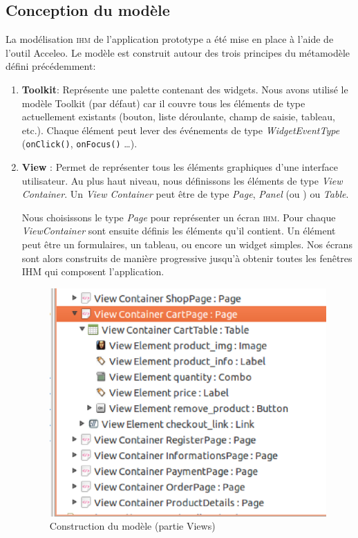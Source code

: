 \subsection{Conception du modèle}
La modélisation \textsc{ihm} de l'application prototype \kwplay{} a été mise en place à l'aide de l'outil Acceleo. Le modèle est construit autour des trois principes du métamodèle défini précédemment:
\begin{enumerate}
\item \textbf{Toolkit}: Représente une palette contenant des widgets. Nous avons utilisé le modèle Toolkit (par défaut) car il couvre tous les éléments de type   actuellement existants (bouton, liste déroulante, champ de saisie, tableau, etc.). Chaque élément  peut lever des événements de type \textit{WidgetEventType} (\verb+onClick()+, \verb+onFocus()+ \dots). 

\item \textbf{View} : Permet de représenter tous les éléments graphiques d'une interface utilisateur. Au plus haut niveau, nous définissons les éléments de type \textit{View Container}. Un \textit{View Container} peut être de type \textit{Page}, \textit{Panel} (ou ) ou \textit{Table}. 

Nous choisissons le type \textit{Page} pour représenter un écran \textsc{ihm}. Pour chaque \textit{ViewContainer} sont ensuite définis les éléments qu'il contient. Un élément peut être un formulaires, un tableau, ou encore un widget simples. Nos écrans sont alors construits de manière progressive jusqu'à obtenir toutes les fenêtres \textsc{IHM} qui composent l'application.
\begin{figure}[H]
  \centering
  \includegraphics[scale=.4]{img/views.eps}
  \caption{Construction du modèle (partie Views)}
  \label{fig:view}
\end{figure}


\end{enumerate}
